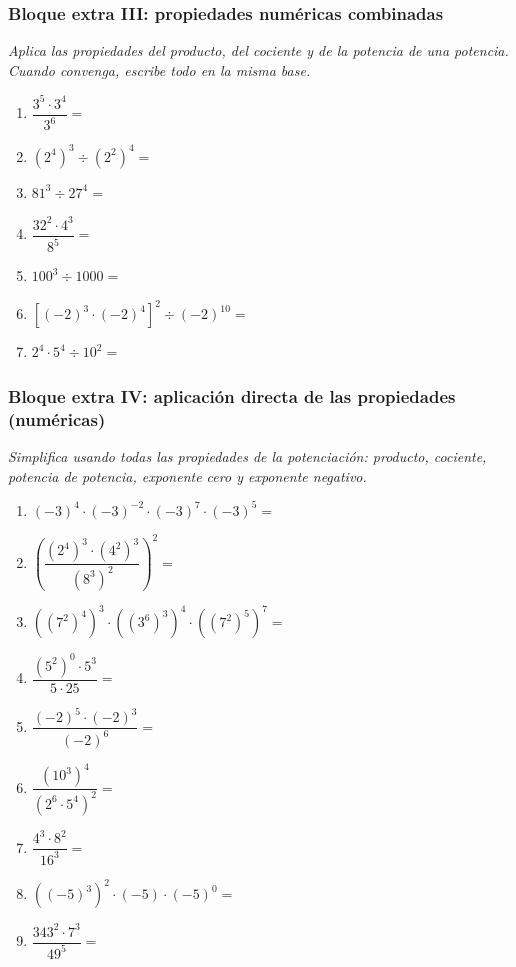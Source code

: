 \documentclass[12pt, letterpaper]{article}
\begin{document}
\subsubsection*{Bloque extra III: propiedades numéricas combinadas}
\textit{Aplica las propiedades del producto, del cociente y de la potencia de una potencia. Cuando convenga, escribe todo en la misma base.}

\begin{enumerate}[leftmargin=*, start=86]
  \item \medio{} $\dfrac{3^5 \cdot 3^4}{3^6} =$

  \item \medio{} $\left(2^4\right)^3 \div \left(2^2\right)^4 =$

  \item \medio{} $81^3 \div 27^4 =$

  \item \medio{} $\dfrac{32^2 \cdot 4^3}{8^5} =$

  \item \medio{} $100^3 \div 1000 =$

  \item \dificil{} $\left[(-2)^3 \cdot (-2)^4\right]^2 \div (-2)^{10} =$

  \item \dificil{} $2^4 \cdot 5^4 \div 10^2 =$
\end{enumerate}
\subsubsection*{Bloque extra IV: aplicación directa de las propiedades (numéricas)}
\textit{Simplifica usando todas las propiedades de la potenciación: producto, cociente, potencia de potencia, exponente cero y exponente negativo.}

\begin{enumerate}[leftmargin=*, start=93]
  \item \medio{} $(-3)^4 \cdot (-3)^{-2} \cdot (-3)^7 \cdot (-3)^5 =$

  \item \dificil{} $\left(\dfrac{(2^4)^3 \cdot (4^2)^3}{(8^3)^2}\right)^{2} =$

  \item \dificil{} $\left((7^2)^4\right)^3 \cdot \left((3^6)^3\right)^4 \cdot \left((7^2)^5\right)^7 =$

  \item \medio{} $\dfrac{(5^2)^0 \cdot 5^3}{5 \cdot 25} =$

  \item \medio{} $\dfrac{(-2)^5 \cdot (-2)^3}{(-2)^6} =$

  \item \dificil{} $\dfrac{(10^3)^4}{\left(2^6 \cdot 5^4\right)^2} =$

  \item \medio{} $\dfrac{4^3 \cdot 8^2}{16^3} =$

  \item \medio{} $\left((-5)^3\right)^2 \cdot (-5) \cdot (-5)^0 =$

  \item \dificil{} $\dfrac{343^2 \cdot 7^3}{49^5} =$
\end{enumerate}
\end{document}

